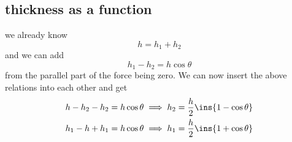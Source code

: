 \subsection{thickness as a function}
we already know 
\begin{equation}
	h=h_1+h_2
\end{equation}
and we can add 
\begin{equation}
	h_1-h_2=h\cos\theta
\end{equation}
from the parallel part of the force being zero. We can now insert the above relations into each other and get 
\begin{align}
	h-h_2-h_2=h\cos\theta \implies h_2=\frac{h}{2}\ins{1-\cos\theta}\\
	h_1-h+h_1=h\cos\theta \implies h_1=\frac{h}{2}\ins{1+\cos\theta}
\end{align}